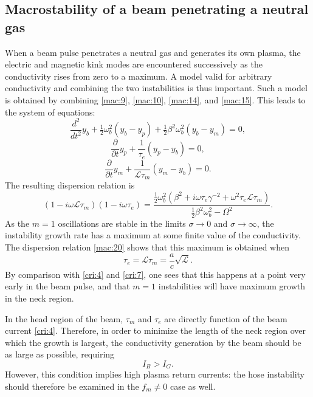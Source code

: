 \documentclass [12pt,a4paper,     ]{report} %
\newcommand{\Oh}{\tfrac{1}{2}}        %
\begin{document}
\subsection{Macrostability of a beam penetrating a neutral gas}
 

	When a beam pulse penetrates a neutral gas and generates its own  plasma, the electric and magnetic kink modes are encountered successively as the conductivity rises from zero to a maximum.  A model valid for arbitrary conductivity and combining the two instabilities is thus important.  Such a model is obtained by combining \eqref{mac:9}, \eqref{mac:10}, \eqref{mac:14}, and \eqref{mac:15}.  This leads to the system of equations:
%
\begin{equation}\label{mac:17} %
   \frac{d^2}{dt^2} y_b + \Oh        \omega_b^2 (y_b - y_p)
                        + \Oh \beta^2\omega_b^2 (y_b - y_m)  = 0,
\end{equation}
%
%
\begin{equation}\label{mac:18} %
   \frac{\partial}{\partial t} y_p + \frac{1}{\tau_e} (y_p - y_b) = 0,
\end{equation}
%
%
\begin{equation}\label{mac:19} %
\frac{\partial}{\partial t} y_m + \frac{1}{\mathcal{L}\tau_m} (y_m - y_b) = 0.
\end{equation}
%
The resulting dispersion relation is \cite{UHM--1981-,LEE--1975-}
%
\begin{equation}\label{mac:20} %
   (1-i\omega\mathcal{L}\tau_m)(1-i\omega\tau_e)
 = \frac{  \Oh\omega_b^2 (\beta^2
         + i\omega\tau_e\gamma^{-2}
         + \omega^2\tau_e\mathcal{L}\tau_m) }
        {  \Oh\beta^2\omega_b^2  - \Omega^2 }.
\end{equation}
%
As the $m=1$ oscillations are stable in the limits $\sigma \rightarrow 0$ and $\sigma \rightarrow \infty$, the instability growth rate has a maximum at some finite value of the conductivity.  The dispersion relation \eqref{mac:20} shows that this maximum is obtained when
%
\begin{equation}\label{mac:21} %
      \tau_e = \mathcal{L}\tau_m = \frac{a}{c} \sqrt{\mathcal{L}}.
\end{equation}
%
By comparison with \eqref{cri:4} and \eqref{cri:7}, one sees that this happens at a point very early in the beam pulse, and that $m=1$ instabilities will have maximum growth in the neck region.

	In the head region of the beam, $\tau_m$ and $\tau_e$ are directly function of the beam current \eqref{cri:4}.  Therefore, in order to minimize the length of the neck region over which the growth is largest, the conductivity generation by the beam should be as large as possible, requiring
%
\begin{equation}\label{mac:22} %
                     I_B > I_G.
\end{equation}
%
However, this condition implies high plasma return currents: the hose instability should therefore be examined in the $f_m \neq 0$ case as well.
\end{document}
